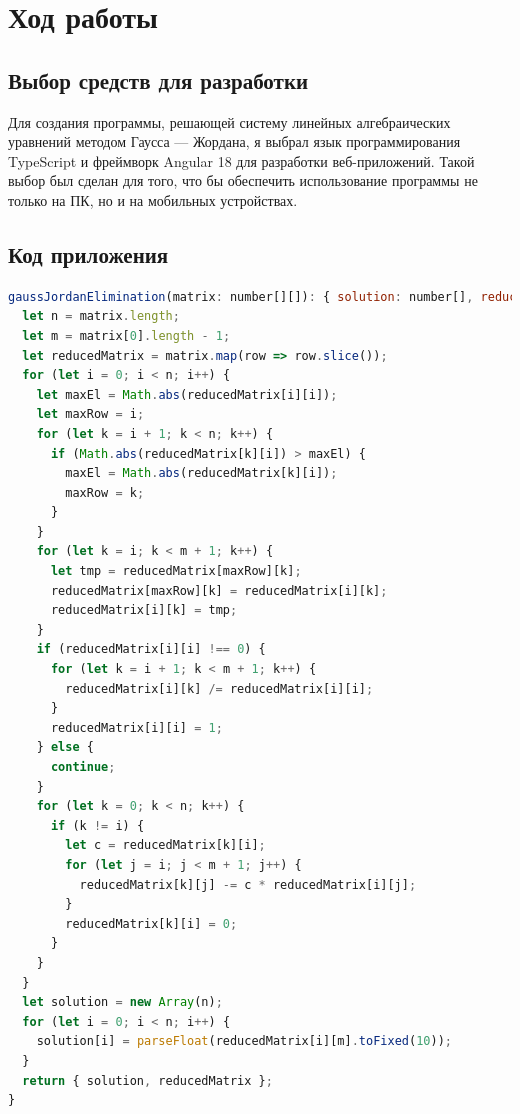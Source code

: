 \documentclass[12pt,a4paper]{scrartcl}
\begin{document}
\section{Ход работы}
    \subsection{Выбор средств для разработки}
    Для создания программы, решающей систему линейных алгебраических уравнений методом Гаусса — Жордана, я выбрал язык программирования TypeScript и фреймворк Angular 18 для разработки веб-приложений. Такой выбор был сделан для того, что бы обеспечить использование программы не только на ПК, но и на мобильных устройствах.
    \subsection{Код приложения} 
\begin{lstlisting}[language=JavaScript, caption=Gauss-Jordan Elimination Function]
gaussJordanElimination(matrix: number[][]): { solution: number[], reducedMatrix: number[][] } {
  let n = matrix.length;
  let m = matrix[0].length - 1;
  let reducedMatrix = matrix.map(row => row.slice());
  for (let i = 0; i < n; i++) {
    let maxEl = Math.abs(reducedMatrix[i][i]);
    let maxRow = i;
    for (let k = i + 1; k < n; k++) {
      if (Math.abs(reducedMatrix[k][i]) > maxEl) {
        maxEl = Math.abs(reducedMatrix[k][i]);
        maxRow = k;
      }
    }
    for (let k = i; k < m + 1; k++) {
      let tmp = reducedMatrix[maxRow][k];
      reducedMatrix[maxRow][k] = reducedMatrix[i][k];
      reducedMatrix[i][k] = tmp;
    }
    if (reducedMatrix[i][i] !== 0) {
      for (let k = i + 1; k < m + 1; k++) {
        reducedMatrix[i][k] /= reducedMatrix[i][i];
      }
      reducedMatrix[i][i] = 1;
    } else {
      continue;
    }
    for (let k = 0; k < n; k++) {
      if (k != i) {
        let c = reducedMatrix[k][i];
        for (let j = i; j < m + 1; j++) {
          reducedMatrix[k][j] -= c * reducedMatrix[i][j];
        }
        reducedMatrix[k][i] = 0;
      }
    }
  }
  let solution = new Array(n);
  for (let i = 0; i < n; i++) {
    solution[i] = parseFloat(reducedMatrix[i][m].toFixed(10));
  }
  return { solution, reducedMatrix };
}
\end{lstlisting}
\end{document}
